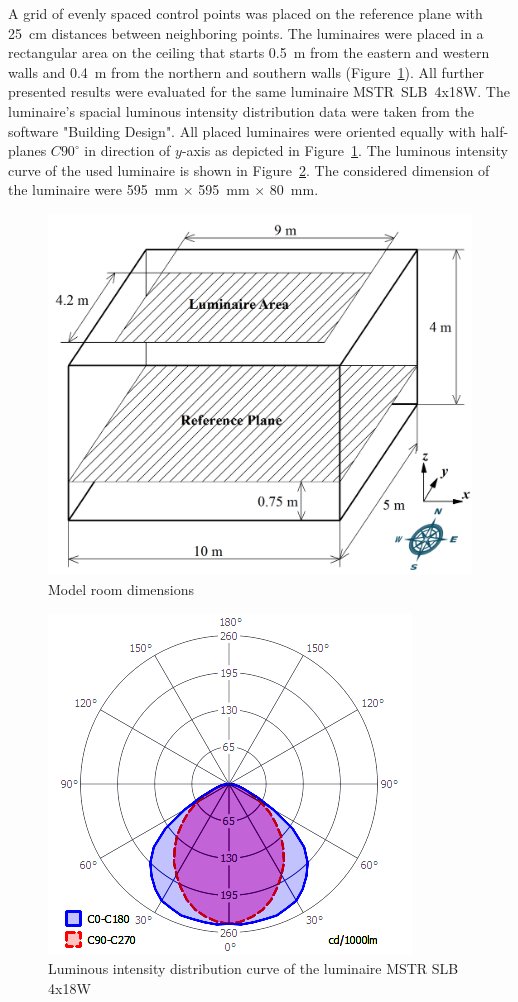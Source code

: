 A grid of evenly spaced control points was placed on the reference plane with 25~cm distances between neighboring points. The luminaires were placed in a rectangular area on the ceiling that starts 0.5~m from the eastern and western walls and 0.4~m from the northern and southern walls (Figure~\ref{fig:modRoom}). All further presented results were evaluated for the same luminaire  MSTR~SLB~4x18W. The luminaire's spacial luminous intensity distribution data were taken from the software "Building Design". All placed luminaires were oriented equally with half-planes $C90^\circ$ in direction of $y$-axis as depicted in Figure~\ref{fig:modRoom}. The luminous intensity curve of the used luminaire is shown in Figure~\ref{fig:IDiag}. The considered dimension of the luminaire were 595~mm $\times$ 595~mm $\times$ 80~mm.

\begin{figure}[htb]
  \centering
  \includegraphics[width=\columnwidth]{modRoom2}
  \caption{Model room dimensions}
  \label{fig:modRoom}
\end{figure}

\begin{figure}[htb]
  \centering
  \includegraphics[width=0.8\columnwidth]{IDiag}
  \caption{Luminous intensity distribution curve of the luminaire MSTR SLB 4x18W}
  \label{fig:IDiag}
\end{figure}